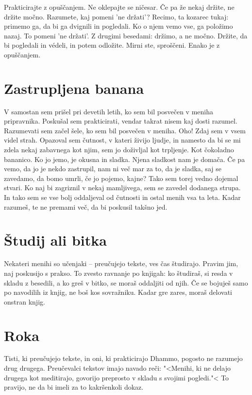Prakticirajte z opuščanjem. Ne oklepajte se ničesar. Če pa že nekaj držite, ne držite močno. Razumete, kaj pomeni 'ne držati'? Recimo, ta kozarec tukaj: primemo ga, da bi ga dvignili in pogledali. Ko o njem vemo vse, ga položimo nazaj. To pomeni 'ne držati'. Z drugimi besedami: držimo, a ne močno. Držite, da bi pogledali in védeli, in potem odložite. Mirni ste, sproščeni. Enako je z opuščanjem.

\section{Zastrupljena banana}

V samostan sem prišel pri devetih letih, ko sem bil posvečen v meniha pripravnika. Poskušal sem prakticirati, vendar takrat nisem kaj dosti razumel. Razumevati sem začel šele, ko sem bil posvečen v meniha. Oho! Zdaj sem v vsem videl strah. Opazoval sem čutnost, v kateri živijo ljudje, in namesto da bi se mi zdela nekaj zabavnega kot njim, sem jo doživljal kot trpljenje. Kot čokoladno bananico. Ko jo jemo, je okusna in sladka. Njena sladkost nam je domača. Če pa vemo, da jo je nekdo zastrupil, nam ni več mar za to, da je sladka, saj se zavedamo, da bomo umrli, če jo pojemo, kajne? Tako sem torej vedno dojemal stvari. Ko naj bi zagriznil v nekaj mamljivega, sem se zavedel dodanega strupa. In tako sem se vse bolj oddaljeval od čutnosti in ostal menih vsa ta leta. Kadar razumeš, te ne premami več, da bi poskusil takšno jed.

\section{Študij ali bitka}

Nekateri menihi so učenjaki – preučujejo tekste, ves čas študirajo. Pravim jim, naj poskusijo s prakso. To zvesto ravnanje po knjigah: ko študiraš, si resda v skladu z besedili, a ko greš v bitko, se moraš oddaljiti od njih. Če se bojuješ samo po navodilih iz knjig, ne boš kos sovražniku. Kadar gre zares, moraš delovati onstran knjig.

\section{Roka}

Tisti, ki preučujejo tekste, in oni, ki prakticirajo Dhammo, pogosto ne razumejo drug drugega. Preučevalci tekstov imajo navado reči: "<Menihi, ki ne delajo drugega kot meditirajo, govorijo preprosto v skladu s svojimi pogledi."< To pravijo, ne da bi imeli za to kakršenkoli dokaz.

